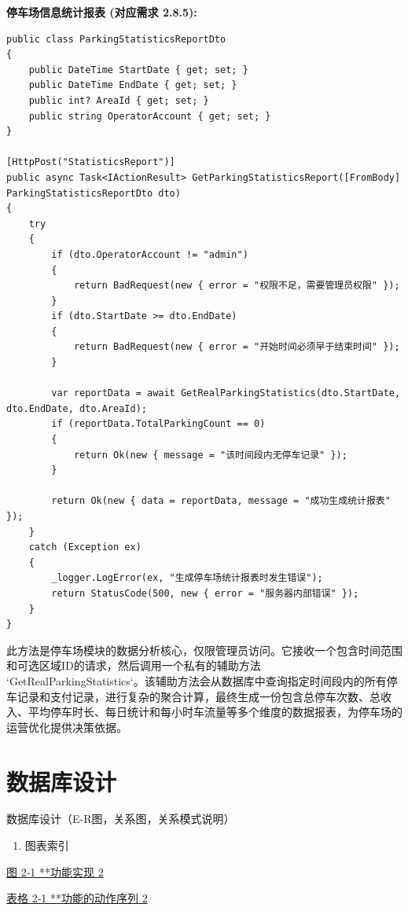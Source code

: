 \documentclass[]{article}
\begin{document}
\textbf{停车场信息统计报表 (对应需求 2.8.5):}
\begin{verbatim}
public class ParkingStatisticsReportDto
{
    public DateTime StartDate { get; set; }
    public DateTime EndDate { get; set; }
    public int? AreaId { get; set; }
    public string OperatorAccount { get; set; }
}

[HttpPost("StatisticsReport")]
public async Task<IActionResult> GetParkingStatisticsReport([FromBody] ParkingStatisticsReportDto dto)
{
    try
    {
        if (dto.OperatorAccount != "admin")
        {
            return BadRequest(new { error = "权限不足，需要管理员权限" });
        }
        if (dto.StartDate >= dto.EndDate)
        {
            return BadRequest(new { error = "开始时间必须早于结束时间" });
        }

        var reportData = await GetRealParkingStatistics(dto.StartDate, dto.EndDate, dto.AreaId);
        if (reportData.TotalParkingCount == 0)
        {
            return Ok(new { message = "该时间段内无停车记录" });
        }

        return Ok(new { data = reportData, message = "成功生成统计报表" });
    }
    catch (Exception ex)
    {
        _logger.LogError(ex, "生成停车场统计报表时发生错误");
        return StatusCode(500, new { error = "服务器内部错误" });
    }
}
\end{verbatim}
此方法是停车场模块的数据分析核心，仅限管理员访问。它接收一个包含时间范围和可选区域ID的请求，然后调用一个私有的辅助方法 `GetRealParkingStatistics`。该辅助方法会从数据库中查询指定时间段内的所有停车记录和支付记录，进行复杂的聚合计算，最终生成一份包含总停车次数、总收入、平均停车时长、每日统计和每小时车流量等多个维度的数据报表，为停车场的运营优化提供决策依据。

\hypertarget{ux6570ux636eux5e93ux8bbeux8ba1}{%
\section{数据库设计}\label{ux6570ux636eux5e93ux8bbeux8ba1}}

数据库设计（E-R图，关系图，关系模式说明）

\begin{enumerate}
\def\labelenumi{\Alph{enumi}.}
\item
  \protect\hypertarget{_Toc153177886}{}{\protect\hypertarget{_Toc153186299}{}{\protect\hypertarget{_Toc155321769}{}{\protect\hypertarget{_Toc77076522}{}{}}}}图表索引
\end{enumerate}

\protect\hyperlink{_Toc394245023}{{图 2‑1 **功能实现} 2}

\protect\hyperlink{_Toc394245026}{{表格 2‑1 **功能的动作序列} 2}
\end{document}
